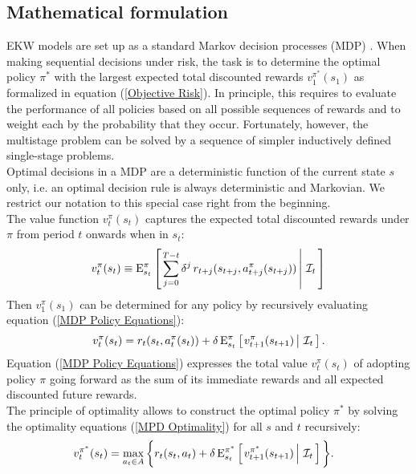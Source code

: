 \subsection{Mathematical formulation}\label{Mathematics}
EKW models are set up as a standard Markov decision processes (MDP) \citep{Puterman.1994,White.1993}. When making sequential decisions under risk, the task is to determine the optimal policy $\pi^*$ with the largest expected total discounted rewards $v^{\pi^*}_1(s_1)$ as formalized in equation (\ref{Objective Risk}). In principle, this requires to evaluate the performance of all policies based on all possible sequences of rewards and to weight each by the probability that they occur. Fortunately, however, the multistage problem can be solved by a sequence of simpler inductively defined single-stage problems.\\

\noindent Optimal decisions in a MDP are a deterministic function of the current state $s$ only, i.e. an optimal decision rule is always deterministic and Markovian. We restrict our notation to this special case right from the beginning.\\

\noindent The value function $v^\pi_t(s_t)$ captures the expected total discounted rewards under $\pi$ from period $t$ onwards when in $s_t$:
%
\begin{align*}
  v^\pi_t(s_t) \equiv \mathrm{E}_{s_t}^\pi\left[\left.\sum^{T - t}_{j = 0}  \delta^j\, r_{t + j}(s_{t + j}, a^\pi_{t + j}(s_{t + j})) \,\right\vert\,\mathcal{I}_t\,\right]
\end{align*}
%
Then $v_1^\pi(s_1)$ can be determined for any policy by recursively evaluating equation (\ref{MDP Policy Equations}):
%
\begin{align}\label{MDP Policy Equations}
v^\pi_t(s_t) = r_t(s_t,  a^\pi_t(s_t)) + \delta\,\mathrm{E}^\pi_{s_t} \left[\left.v^\pi_{t + 1}(s_{t + 1})  \,\right\vert\,\mathcal{I}_t\,\right].
\end{align}
%
Equation (\ref{MDP Policy Equations}) expresses the total value $v^\pi_t(s_t)$ of adopting policy $\pi$ going forward as the sum of its immediate rewards and all expected discounted future rewards.\\

\noindent The principle of optimality allows to construct the optimal policy $\pi^*$ by solving the optimality equations (\ref{MPD Optimality})  for all $s$ and $t$ recursively:
%
\begin{align}\label{MPD Optimality}
v^{\pi^*}_t(s_t)  & = \max_{a_t \in A}\bigg\{ r_t(s_t, a_t) + \delta\, \mathrm{E}^{\pi^*}_{s_t} \left[\left.v^{\pi^*}_{t + 1}(s_{t + 1})\,\right\vert\,\mathcal{I}_t\,\right] \bigg\}.
\end{align}

